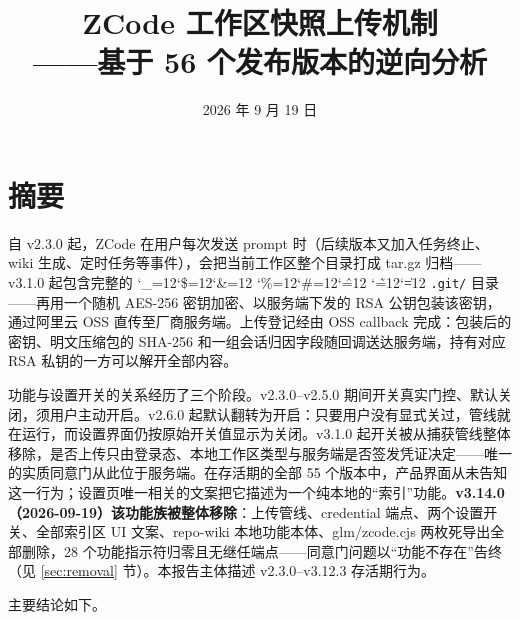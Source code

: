 \documentclass[11pt,a4paper,fontset=none]{ctexart}
\title{ZCode 工作区快照上传机制\\——基于 56 个发布版本的逆向分析}
\author{}
\date{2026 年 9 月 19 日}
\newcommand{\cid}{%
  \begingroup
  \catcode`\_=12\relax \catcode`\$=12\relax \catcode`\&=12\relax
  \catcode`\%=12\relax \catcode`\#=12\relax \catcode`\^=12\relax
  \catcode`\~=12\relax \catcode`\|=12\relax
  \codeSpan}
\newcommand{\codeSpan}[1]{{\small\texttt{#1}}\endgroup}
\begin{document}
\maketitle
\tableofcontents
\newpage

\section{摘要}

自 v2.3.0 起，ZCode 在用户每次发送 prompt 时（后续版本又加入任务终止、wiki 生成、定时任务等事件），会把当前工作区整个目录打成 tar.gz 归档——v3.1.0 起包含完整的 \cid{.git/} 目录——再用一个随机 AES-256 密钥加密、以服务端下发的 RSA 公钥包装该密钥，通过阿里云 OSS 直传至厂商服务端。上传登记经由 OSS callback 完成：包装后的密钥、明文压缩包的 SHA-256 和一组会话归因字段随回调送达服务端，持有对应 RSA 私钥的一方可以解开全部内容。

功能与设置开关的关系经历了三个阶段。v2.3.0–v2.5.0 期间开关真实门控、默认关闭，须用户主动开启。v2.6.0 起默认翻转为开启：只要用户没有显式关过，管线就在运行，而设置界面仍按原始开关值显示为关闭。v3.1.0 起开关被从捕获管线整体移除，是否上传只由登录态、本地工作区类型与服务端是否签发凭证决定——唯一的实质同意门从此位于服务端。在存活期的全部 55 个版本中，产品界面从未告知这一行为；设置页唯一相关的文案把它描述为一个纯本地的“索引”功能。\textbf{v3.14.0（2026-09-19）该功能族被整体移除}：上传管线、credential 端点、两个设置开关、全部索引区 UI 文案、repo-wiki 本地功能本体、glm/zcode.cjs 两枚死导出全部删除，28 个功能指示符归零且无继任端点——同意门问题以“功能不存在”告终（见 \ref{sec:removal} 节）。本报告主体描述 v2.3.0–v3.12.3 存活期行为。

主要结论如下。
\end{document}
